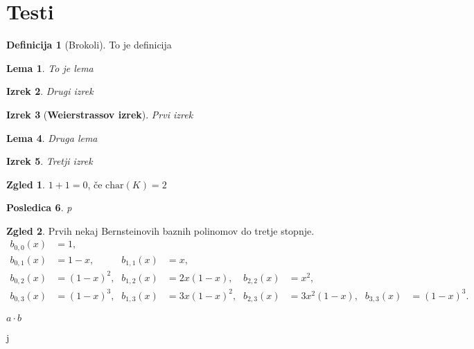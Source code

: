 \documentclass[a4paper]{amsart}
\theoremstyle{theorem}
\newtheorem{izrek}{Izrek}[section]
\newtheorem{lema}[izrek]{Lema}
\newtheorem{posledica}[izrek]{Posledica}
\theoremstyle{definition}
\newtheorem{definicija}{Definicija}[section]
\newtheorem*{zgled*}{Zgled}
\begin{document}
\newpage
\section{Testi}

\begin{definicija}[Brokoli]
	To je definicija
\end{definicija}

\begin{lema}
	To je lema
\end{lema}

\begin{izrek}
	Drugi izrek
\end{izrek}

\begin{izrek}[\textbf{Weierstrassov izrek}]
	Prvi izrek
\end{izrek}

\begin{lema}
	Druga lema
\end{lema}

\begin{izrek}
	Tretji izrek
\end{izrek}

\begin{zgled*}
	$1 + 1 = 0$, če $\text{char}(K) = 2$
\end{zgled*}

\begin{posledica}
	p
\end{posledica}

\begin{zgled*}
	Prvih nekaj Bernsteinovih baznih polinomov do tretje stopnje.
		\begin{align*}
			b_{0,0}(x) &= 1\text{,}          &             &               
			&             &               &             &  \\
			b_{0,1}(x) &= 1 - x\text{,}      &  b_{1,1}(x) &= x\text{,}            
			&             &               &             &  \\
			b_{0,2}(x) &= (1 - x)^2\text{,}  &  b_{1,2}(x) &= 2x(1 - x)\text{,}    
			&  b_{2,2}(x) &= x^2\text{,}          &             &  \\ 
			b_{0,3}(x) &= (1 - x)^3\text{,}  &  b_{1,3}(x) &= 3x(1 - x)^2\text{,}  
			&  b_{2,3}(x) &= 3x^2(1 - x)\text{,}  &  b_{3,3}(x) &= (1 - x)^3\text{.}
		\end{align*}
	\end{zgled*}

$ a \cdot b$

\newpage
j
\end{document}
